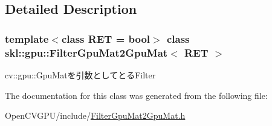 \subsection{Detailed Description}
\subsubsection*{template$<$class R\+ET = bool$>$\newline
class skl\+::gpu\+::\+Filter\+Gpu\+Mat2\+Gpu\+Mat$<$ R\+E\+T $>$}

cv\+::gpu\+::\+Gpu\+Matを引数としてとる\+Filter 

The documentation for this class was generated from the following file\+:\begin{DoxyCompactItemize}
\item 
Open\+C\+V\+G\+P\+U/include/\hyperlink{_filter_gpu_mat2_gpu_mat_8h}{Filter\+Gpu\+Mat2\+Gpu\+Mat.\+h}\end{DoxyCompactItemize}
